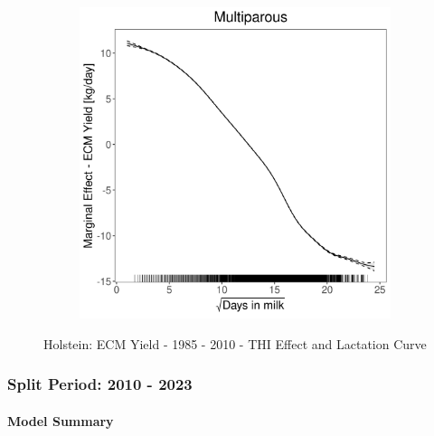 \begin{figure}[H]
\begin{subfigure}[b]{0.45\textwidth}
    \end{subfigure}
    \hspace{0.05\textwidth} %
    \begin{subfigure}[b]{0.45\textwidth}
        \centering
        \includegraphics[width=\textwidth]{thesis/figures/models/ecm/before2010/ho_ecm_before2010/ho_ecm_before2010_marginal_dim_milk_multi.png}
    \end{subfigure}
    \caption[]{Holstein: ECM Yield - 1985 - 2010 - THI Effect and Lactation Curve}
    \label{fig:main}
\end{figure}

\subsubsection{Split Period: 2010 - 2023}\label{model:ho_ecm_after}

\paragraph{Model Summary} \quad \\

